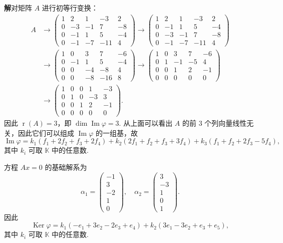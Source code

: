 \documentclass[UTF8, 12pt, fontset=fandol, oneside]{ctexart}
\begin{document}
\noindent\textbf{解}\quad 对矩阵 $A$ 进行初等行变换：
\[
\begin{aligned}
A&\to
\left(\begin{array}{rrrrr}
1&2&1&-3&2\\
0&-3&-1&7&-8\\
0&-1&1&5&-4\\
0&-1&-7&-11&4
\end{array}\right)
\to
\left(\begin{array}{rrrrr}
1&2&1&-3&2\\
0&-1&1&5&-4\\
0&-3&-1&7&-8\\
0&-1&-7&-11&4
\end{array}\right)\\
&\to
\left(\begin{array}{rrrrr}
1&0&3&7&-6\\
0&-1&1&5&-4\\
0&0&-4&-8&4\\
0&0&-8&-16&8
\end{array}\right)
\to
\left(\begin{array}{rrrrr}
1&0&3&7&-6\\
0&1&-1&-5&4\\
0&0&1&2&-1\\
0&0&0&0&0
\end{array}\right)\\
&\to
\left(\begin{array}{rrrrr}
1&0&0&1&-3\\
0&1&0&-3&3\\
0&0&1&2&-1\\
0&0&0&0&0
\end{array}\right).
\end{aligned}
\]
因此 $\operatorname{r}(A)=3$，即 $\dim\operatorname{Im}\varphi=3$. 从上面可以看出 $A$ 的前 3 个列向量线性无关，因此它们可以组成 $\operatorname{Im}\varphi$ 的一组基，故
\[
\operatorname{Im}\varphi=k_1(f_1+2f_2+f_3+2f_4)+k_2(2f_1+f_2+f_3+3f_4)+k_3(f_1+f_2+2f_3-5f_4),
\]
其中 $k_i$ 可取 $\mathbb{K}$ 中的任意数.

方程 $Ax=0$ 的基础解系为
\[
\alpha_1=\left(\begin{array}{r}
-1\\
3\\
-2\\
1\\
0
\end{array}\right),\quad
\alpha_2=\left(\begin{array}{r}
3\\
-3\\
1\\
0\\
1
\end{array}\right).
\]
因此
\[
\operatorname{Ker}\varphi=k_1(-e_1+3e_2-2e_3+e_4)+k_2(3e_1-3e_2+e_3+e_5),
\]
其中 $k_i$ 可取 $\mathbb{K}$ 中的任意数.
\end{document}
